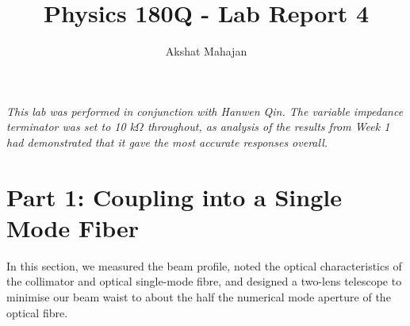 \documentclass[10pt,a4paper]{article}
\author{Akshat Mahajan}
\title{Physics 180Q - Lab Report 4}
\begin{document}
\maketitle

\textsl{This lab was performed in conjunction with Hanwen Qin. The variable impedance terminator was set to 10 k$\Omega$ throughout, as analysis of the results from Week 1 had demonstrated that it gave the most accurate responses overall.}

\section*{Part 1: Coupling into a Single Mode Fiber}

In this section, we measured the beam profile, noted the optical characteristics of the collimator and optical single-mode fibre, and designed a two-lens telescope to minimise our beam waist to about the half the numerical mode aperture of the optical fibre.
\end{document}
